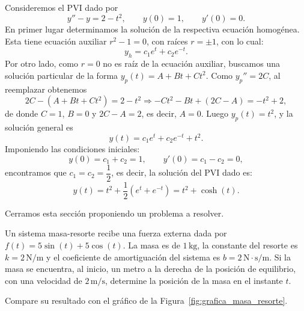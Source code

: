 \begin{example}
    Consideremos el PVI dado por
    \[
    y''-y=2-t^2,\qquad y(0)=1,\qquad y'(0)=0.
    \]
    En primer lugar determinamos la soluci\'on de la respectiva ecuaci\'on homog\'enea. Esta tiene ecuaci\'on auxiliar $r^2-1=0$, con ra\'ices $r=\pm1$, con lo cual:
    \[
    y_h=c_1e^t+c_2e^{-t}.
    \]
    Por otro lado, como $r=0$ no es ra\'iz de la ecuaci\'on auxiliar, buscamos una soluci\'on particular de la forma $y_p(t)=A+Bt+Ct^2$. Como $y_p''=2C$, al reemplazar obtenemos
    \[
    2C-(A+Bt+Ct^2)=2-t^2\Longrightarrow -Ct^2-Bt+(2C-A)=-t^2+2,
    \]
    de donde $C=1$, $B=0$ y $2C-A=2$, es decir, $A=0$. Luego $y_p(t)=t^2$, y la soluci\'on general es
    \[
    y(t)=c_1e^t+c_2e^{-t}+t^2.
    \]
    Imponiendo las condiciones iniciales:
    \[
    y(0)=c_1+c_2=1,\qquad y'(0)=c_1-c_2=0,
    \]
    encontramos que $c_1=c_2=\dfrac{1}{2}$, es decir, la soluci\'on del PVI dado es:
    \[
    y(t)=t^2+\dfrac{1}{2}\left(e^t+e^{-t}\right)=t^2+\cosh(t).
    \]
\end{example}

Cerramos esta secci\'on proponiendo un problema a resolver.

\begin{exercise}
    Un sistema masa-resorte recibe una fuerza externa dada por $f(t)=5\sin(t)+5\cos(t)$. La masa es de $1\,\mathrm{kg}$, la constante del resorte es $k=2\,\mathrm{N/m}$ y el coeficiente de amortiguaci\'on del sistema es $b=2\,\mathrm{N\cdot s/m}$. Si la masa se encuentra, al inicio, un metro a la derecha de la posici\'on de equilibrio, con una velocidad de $2\,\mathrm{m/s}$, determine la posici\'on de la masa en el instante $t$.

    Compare su resultado con el gr\'afico de la Figura~\ref{fig:grafica_masa_resorte}.
\end{exercise}

